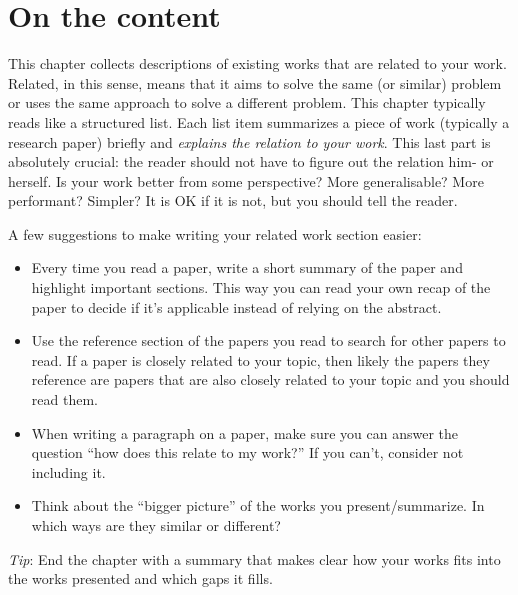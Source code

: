 \section{On the content}
This chapter collects descriptions of existing works that are related to your work. Related, in this sense, means that it aims to solve the same (or similar) problem or uses the same approach to solve a different problem. This chapter typically reads like a structured list. Each list item summarizes a piece of work (typically a research paper) briefly and \emph{explains the relation to your work}. This last part is absolutely crucial: the reader should not have to figure out the relation him- or herself. Is your work better from some perspective? More generalisable? More performant? Simpler? It is OK if it is not, but you should tell the reader.

A few suggestions to make writing your related work section easier:
\begin{itemize}
    \item Every time you read a paper, write a short summary of the paper and highlight important sections. This way you can read your own recap of the paper to decide if it's applicable instead of relying on the abstract.
    \item Use the reference section of the papers you read to search for other papers to read. If a paper is closely related to your topic, then likely the papers they reference are papers that are also closely related to your topic and you should read them.
    \item When writing a paragraph on a paper, make sure you can answer the question ``how does this relate to my work?'' If you can't, consider not including it. 
    \item Think about the ``bigger picture'' of the works you present/summarize. In which ways are they similar or different? 
\end{itemize}
    
\emph{Tip}: End the chapter with a summary that makes clear how your works fits into the works presented and which gaps it fills.